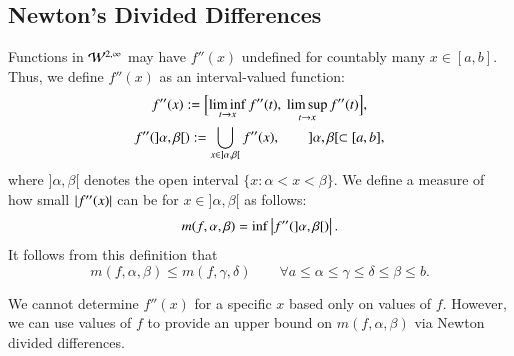 \documentclass[review]{elsarticle}
\theoremstyle{definition}
\begin{document}
\subsection{Newton's Divided Differences} \label{sec:ndd}

Functions in $\mathcal{W}^{2,\infty}$ may have $f''(x)$ undefined for countably many $x \in [a,b]$.  Thus, we define $f''(x)$ as an interval-valued function:
\begin{gather*}
f''(x) := \Bigl[\liminf_{t \to x} f''(t), \ \limsup_{t \to x} f''(t) \Bigr], \\
 f''(]\alpha, \beta[) := \bigcup_ {x \in ]\alpha, \beta[} f''(x), \qquad  ]\alpha, \beta[ \subset [a,b],
\end{gather*}
where $]\alpha, \beta[$ denotes the open interval  $\{x:\alpha<x<\beta\}$.
We define a
measure of how small $\left \lvert f''(x) \right \rvert$ can be for  $x \in ]\alpha, \beta[$ as follows:
\begin{equation} \label{minfppdef}
m(f,\alpha, \beta) = \inf \left \lvert f''(]\alpha, \beta[) \right \rvert.
\end{equation}
It follows from this definition
that
\begin{equation} \label{mdec}
m(f,\alpha,\beta) \le m(f,\gamma,\delta) \qquad \forall a \le \alpha \le \gamma \le \delta \le \beta \le b.
\end{equation}

We cannot determine $f''(x)$ for a specific $x$ based only on values of $f$. However,
we can use values of $f$ to provide an upper bound on $m(f,\alpha, \beta)$ via Newton divided differences.
\end{document}
